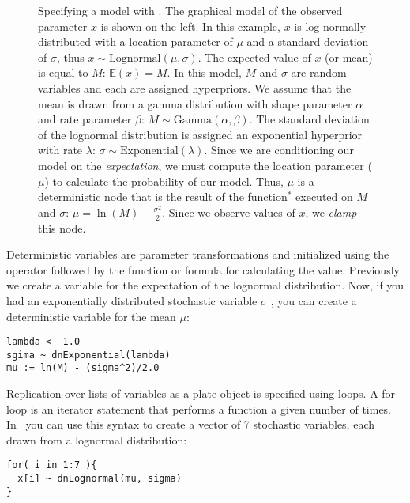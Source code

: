 \begin{figure}[h!]
\centering
{}
\caption{\small Specifying a model with \Rev. 
The graphical model of the observed parameter $x$ is shown on the left. 
In this example, $x$ is log-normally distributed with a location parameter of $\mu$ and a standard deviation of $\sigma$, thus $x \sim \mbox{Lognormal}(\mu, \sigma)$. 
The expected value of $x$ (or mean) is equal to $M$: $\mathbb{E}(x) = M$. 
In this model, $M$ and $\sigma$ are random variables and each are assigned hyperpriors. 
We assume that the mean is drawn from a gamma distribution with shape parameter $\alpha$ and rate parameter $\beta$: $M \sim \mbox{Gamma}(\alpha, \beta)$. 
The standard deviation of the lognormal distribution is assigned an exponential hyperprior with rate $\lambda$: $\sigma \sim \mbox{Exponential}(\lambda)$. 
Since we are conditioning our model on the \emph{expectation}, we must compute the location parameter ($\mu$) to 
calculate the probability of our model. 
Thus, $\mu$ is a deterministic node that is the result of the function$^*$ executed on $M$ and $\sigma$: $\mu = \ln(M) - \frac{\sigma^2}{2}$. 
Since we observe values of $x$, we \emph{clamp} this node.
}
\label{revgmexample}
\end{figure}

Deterministic variables are parameter transformations and initialized using the \cl{:=} operator followed by the function or formula for calculating the value. 
Previously we create a variable for the expectation of the lognormal distribution.
Now, if you had an exponentially distributed stochastic variable $\sigma$ , you can create a deterministic variable for the mean $\mu$:
{\tt \begin{snugshade*}
\begin{lstlisting}
lambda <- 1.0
sgima ~ dnExponential(lambda)
mu := ln(M) - (sigma^2)/2.0
\end{lstlisting}
\end{snugshade*}}

Replication over lists of variables as a plate object is specified using  loops. 
A for-loop is an iterator statement that performs a function a given number of times. 
In \Rev~you can use this syntax to create a vector of 7 stochastic variables, each drawn from a lognormal distribution:
{\tt \begin{snugshade*}
\begin{lstlisting}
for( i in 1:7 ){
  x[i] ~ dnLognormal(mu, sigma)
}
\end{lstlisting}
\end{snugshade*}}

